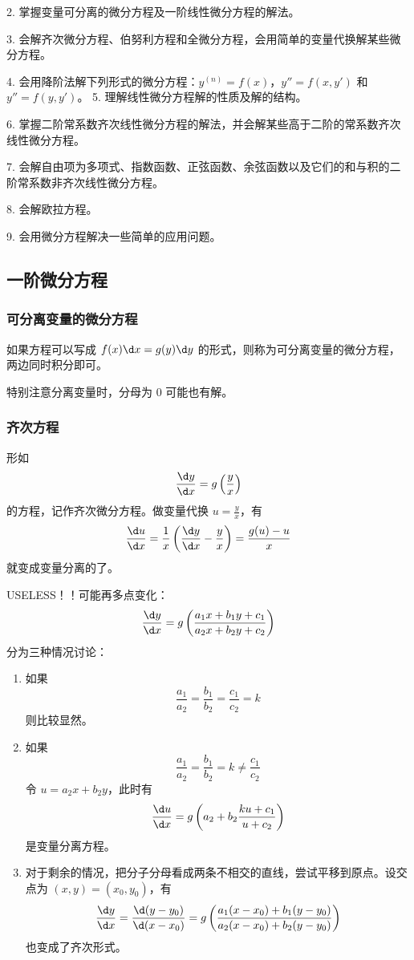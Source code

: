 2. 掌握变量可分离的微分方程及一阶线性微分方程的解法。

3. 会解齐次微分方程、伯努利方程和全微分方程，会用简单的变量代换解某些微分方程。

4. 会用降阶法解下列形式的微分方程：$y^{(n)} = f(x)$，$y''= f(x,y')$ 和 $y''= f(y,y')$。
5. 理解线性微分方程解的性质及解的结构。

6. 掌握二阶常系数齐次线性微分方程的解法，并会解某些高于二阶的常系数齐次线性微分方程。

7. 会解自由项为多项式、指数函数、正弦函数、余弦函数以及它们的和与积的二阶常系数非齐次线性微分方程。

8. 会解欧拉方程。

9. 会用微分方程解决一些简单的应用问题。

\subsection{一阶微分方程}

\subsubsection*{可分离变量的微分方程}

如果方程可以写成 $f(x) \d x = g(y) \d y$ 的形式，则称为可分离变量的微分方程，两边同时积分即可。

\begin{note}
	特别注意分离变量时，分母为 $0$ 可能也有解。
\end{note}

\subsubsection*{齐次方程}

形如
\[ \frac{\d y}{\d x} = g\left(\frac{y}{x}\right) \]
的方程，记作齐次微分方程。做变量代换 $u = \frac{y}{x}$，有
\[ \frac{\d u}{\d x} = \frac{1}{x} \left(\frac{\d y}{\d x} -\frac{y}{x} \right) = \frac{g(u) - u}{x} \]
就变成变量分离的了。

USELESS！！可能再多点变化：
\[ \frac{\d y}{\d x} = g \left(\frac{a_1 x + b_1 y + c_1}{a_2 x + b_2 y + c_2}\right) \]
分为三种情况讨论：
\begin{enumerate}
	\item 如果
	      \[ \frac{a_1}{a_2} = \frac{b_1}{b_2} = \frac{c_1}{c_2} = k \]
	      则比较显然。
	\item 如果
	      \[ \frac{a_1}{a_2} = \frac{b_1}{b_2} = k \neq \frac{c_1}{c_2} \]
	      令 $u = a_2 x + b_2 y$，此时有
	      \[ \frac{\d u}{\d x} = g \left(a_2 + b_2 \frac{k u + c_1}{u + c_2}\right) \]
	      是变量分离方程。
	\item 对于剩余的情况，把分子分母看成两条不相交的直线，尝试平移到原点。设交点为 $(x, y) = (x_0, y_0)$，有
	      \[ \frac{\d y}{\d x} = \frac{\d (y - y_0)}{\d (x - x_0)} = g \left(\frac{a_1 (x - x_0) + b_1 (y - y_0)}{a_2(x - x_0) + b_2 (y - y_0)} \right) \]
	      也变成了齐次形式。
\end{enumerate}

